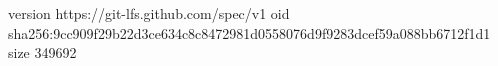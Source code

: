 version https://git-lfs.github.com/spec/v1
oid sha256:9cc909f29b22d3ce634c8c8472981d0558076d9f9283dcef59a088bb6712f1d1
size 349692
